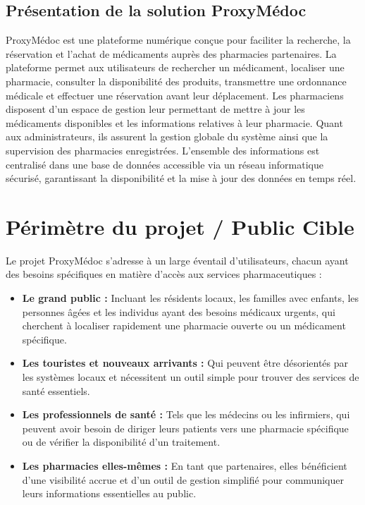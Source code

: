 \documentclass[12pt,a4paper]{report}
\begin{document}
	\subsection{Présentation de la solution ProxyMédoc} %
	ProxyMédoc est une plateforme numérique conçue pour faciliter la recherche, la réservation et l'achat de médicaments auprès des pharmacies partenaires. %
	La plateforme permet aux utilisateurs de rechercher un médicament, localiser une pharmacie, consulter la disponibilité des produits, transmettre une ordonnance médicale et effectuer une réservation avant leur déplacement. %
	Les pharmaciens disposent d'un espace de gestion leur permettant de mettre à jour les médicaments disponibles et les informations relatives à leur pharmacie. %
	Quant aux administrateurs, ils assurent la gestion globale du système ainsi que la supervision des pharmacies enregistrées. %
	L'ensemble des informations est centralisé dans une base de données accessible via un réseau informatique sécurisé, garantissant la disponibilité et la mise à jour des données en temps réel. %
	
	\section{Périmètre du projet / Public Cible} %
	Le projet ProxyMédoc s'adresse à un large éventail d'utilisateurs, chacun ayant des besoins spécifiques en matière d'accès aux services pharmaceutiques : %
	\begin{itemize} %
		\item \textbf{Le grand public :} Incluant les résidents locaux, les familles avec enfants, les personnes âgées et les individus ayant des besoins médicaux urgents, qui cherchent à localiser rapidement une pharmacie ouverte ou un médicament spécifique. %
		\item \textbf{Les touristes et nouveaux arrivants :} Qui peuvent être désorientés par les systèmes locaux et nécessitent un outil simple pour trouver des services de santé essentiels. %
		\item \textbf{Les professionnels de santé :} Tels que les médecins ou les infirmiers, qui peuvent avoir besoin de diriger leurs patients vers une pharmacie spécifique ou de vérifier la disponibilité d'un traitement. %
		\item \textbf{Les pharmacies elles-mêmes :} En tant que partenaires, elles bénéficient d'une visibilité accrue et d'un outil de gestion simplifié pour communiquer leurs informations essentielles au public. %
	\end{itemize} %
	
\end{document}
